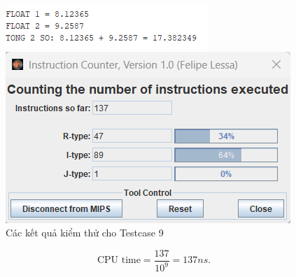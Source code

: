 \begin{figure}[!h]
    \centering
    \begin{minipage}[b]{0.48\textwidth}
        \centering
        \includegraphics[width=\textwidth]{image/TESTCASE/Testcase 9.png}
    \end{minipage}
    \hfill
    \begin{minipage}[b]{0.48\textwidth}
        \centering
        \includegraphics[width=\textwidth]{image/TESTCASE/Instruction Counter 9.png}
    \end{minipage}
    \vspace{0.5cm}
    \caption{Các kết quả kiểm thử cho Testcase 9}
\end{figure}
\[
\text{CPU time} = \frac{\text{137}}{10^9} = 137ns.
\]

